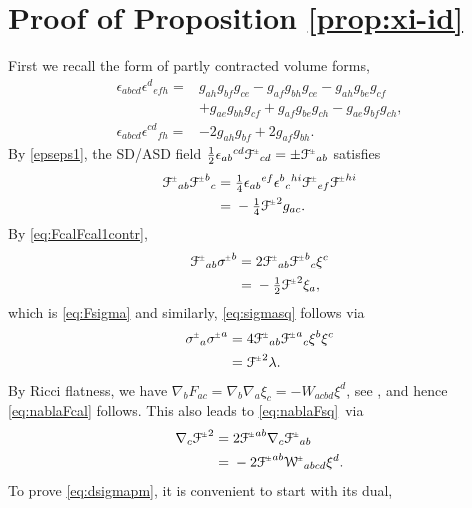 \documentclass[a4paper,10pt,reqno]{amsart}
\theoremstyle{plain}
\newcommand{\PM}[1]{{{#1}^{\hspace{-.5pt}\scaleto{\pm}{3.5pt}}}}
\def\Wcal{\mathcal{W}}
\def\Fcal{\mathcal{F}}
\numberwithin{equation}{section}
\begin{document}
%
\appendix 
%

%
\section{Proof of Proposition \ref{prop:xi-id}} \label{sec:xi-id-proof} 
%

First we recall the form of partly contracted volume forms,
\begin{align}
\epsilon_{abcd}\epsilon^{d}{}_{efh}
={}&g_{ah} g_{bf} g_{ce}
 -  g_{af} g_{bh} g_{ce}  -  g_{ah} g_{be} g_{cf}\nonumber \\
 & + g_{ae} g_{bh} g_{cf}
 + g_{af} g_{be} g_{ch}
 -  g_{ae} g_{bf} g_{ch}, \label{epseps1}\\
\epsilon_{abcd}\epsilon^{cd}{}_{fh}={}&-2 g_{ah} g_{bf}
 + 2 g_{af} g_{bh}.\label{epseps2}
\end{align}
By \eqref{epseps1}, the SD/ASD field $\tfrac{1}{2} \epsilon_{ab}{}^{cd}  \PM{\Fcal}_{cd} = \pm \PM{\Fcal}_{ab} $ satisfies
\begin{align} \label{eq:FcalFcal1contr}
\PM{\Fcal}_{ab} \PM{\Fcal}^{b}{}_{c} 
={}& \tfrac{1}{4} \epsilon_{ab}{}^{ef}\epsilon^{b}{}_{c}{}^{hi} \PM{\Fcal}_{ef} \PM{\Fcal}^{hi} \nonumber \\
={}& -\tfrac{1}{4}  \PM{\Fcal}^2 g_{ac}.
\end{align}
By \eqref{eq:FcalFcal1contr},
\begin{align}
\PM{\Fcal}_{ab} \PM{\sigma}^{b}
={}& 2 \PM{\Fcal}_{ab} \PM{\Fcal}^{b}{}_{c} \xi^{c} \nonumber \\
={}& - \tfrac{1}{2} \PM{\Fcal}^2\xi_{a}, 
\end{align}
which is \eqref{eq:Fsigma} and similarly, \eqref{eq:sigmasq} follows via
\begin{align}
\PM{\sigma}_{a} \PM{\sigma}^{a}
={}& 4 \PM{\Fcal}_{ab} \PM{\Fcal}^{a}{}_{c} \xi^{b} \xi^{c} \nonumber \\
={}& \PM{\Fcal}^2 \lambda.
\end{align}
By Ricci flatness, we have $\nabla_{b} F_{ac} = \nabla_{b}\nabla_{a}\xi_{c} = - W_{acbd} \xi^{d}$, see \cite[Proposition~8.1.3]{PetersenRiemannianGeometry3rd}, and hence \eqref{eq:nablaFcal} follows. This also leads to \eqref{eq:nablaFsq}\ via
\begin{align}
\nabla_{c}\PM{\Fcal}^2
={}&2 \PM{\Fcal}^{ab}\nabla_{c}\PM{\Fcal}_{ab} \nonumber \\
={}&- 2 \PM{\Fcal}^{ab}\PM{\Wcal}_{abcd} \xi^{d}.
\end{align}
To prove \eqref{eq:dsigmapm}, it is convenient to start with its dual,
\end{document}
